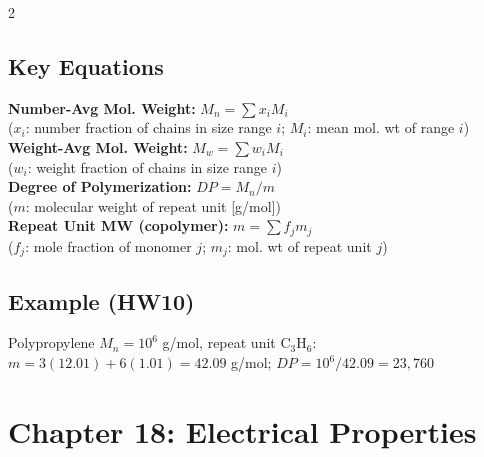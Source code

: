 \documentclass[8pt]{extarticle}
\begin{document}
\begin{multicols*}{2}
\subsection*{Key Equations}
\textbf{Number-Avg Mol. Weight:} $M_n = \sum x_i M_i$ \\
($x_i$: number fraction of chains in size range $i$; $M_i$: mean mol. wt of range $i$) \\
\textbf{Weight-Avg Mol. Weight:} $M_w = \sum w_i M_i$ \\
($w_i$: weight fraction of chains in size range $i$) \\
\textbf{Degree of Polymerization:} $DP = M_n / m$ \\
($m$: molecular weight of repeat unit [g/mol]) \\
\textbf{Repeat Unit MW (copolymer):} $m = \sum f_j m_j$ \\
($f_j$: mole fraction of monomer $j$; $m_j$: mol. wt of repeat unit $j$)
\subsection*{Example (HW10)}
Polypropylene $M_n = 10^6$ g/mol, repeat unit C$_3$H$_6$: \\
$m = 3(12.01)+6(1.01) = 42.09$ g/mol; $DP = 10^6/42.09 = 23,760$

\section*{Chapter 18: Electrical Properties}

\end{multicols*}
\end{document}
